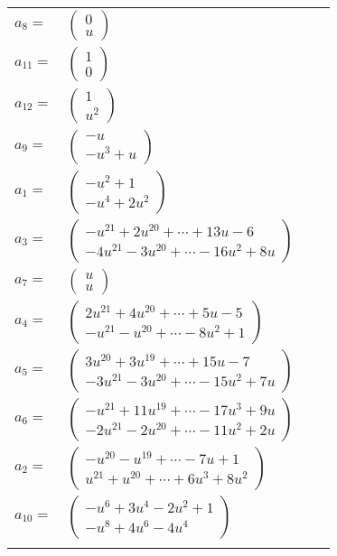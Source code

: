 \documentclass[1p]{elsarticle_modified}
\theoremstyle{definition}
\begin{document}
\begin{tabular}{m{7pt} m{180pt} m{7pt} m{180pt} }
\flushright $a_{8}=$&$\begin{pmatrix}0\\u\end{pmatrix}$ \\
\flushright $a_{11}=$&$\begin{pmatrix}1\\0\end{pmatrix}$ \\
\flushright $a_{12}=$&$\begin{pmatrix}1\\u^2\end{pmatrix}$ \\
\flushright $a_{9}=$&$\begin{pmatrix}- u\\- u^3+u\end{pmatrix}$ \\
\flushright $a_{1}=$&$\begin{pmatrix}- u^2+1\\- u^4+2 u^2\end{pmatrix}$ \\
\flushright $a_{3}=$&$\begin{pmatrix}- u^{21}+2 u^{20}+\cdots+13 u-6\\-4 u^{21}-3 u^{20}+\cdots-16 u^2+8 u\end{pmatrix}$ \\
\flushright $a_{7}=$&$\begin{pmatrix}u\\u\end{pmatrix}$ \\
\flushright $a_{4}=$&$\begin{pmatrix}2 u^{21}+4 u^{20}+\cdots+5 u-5\\- u^{21}- u^{20}+\cdots-8 u^2+1\end{pmatrix}$ \\
\flushright $a_{5}=$&$\begin{pmatrix}3 u^{20}+3 u^{19}+\cdots+15 u-7\\-3 u^{21}-3 u^{20}+\cdots-15 u^2+7 u\end{pmatrix}$ \\
\flushright $a_{6}=$&$\begin{pmatrix}- u^{21}+11 u^{19}+\cdots-17 u^3+9 u\\-2 u^{21}-2 u^{20}+\cdots-11 u^2+2 u\end{pmatrix}$ \\
\flushright $a_{2}=$&$\begin{pmatrix}- u^{20}- u^{19}+\cdots-7 u+1\\u^{21}+u^{20}+\cdots+6 u^3+8 u^2\end{pmatrix}$ \\
\flushright $a_{10}=$&$\begin{pmatrix}- u^6+3 u^4-2 u^2+1\\- u^8+4 u^6-4 u^4\end{pmatrix}$\\&\end{tabular}
\end{document}
